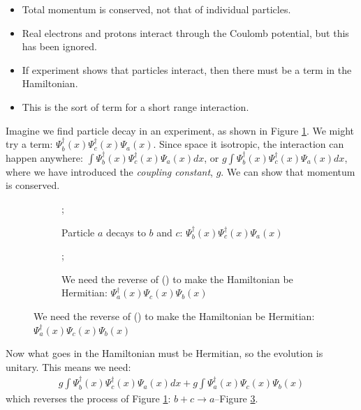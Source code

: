 \documentclass[]{article}
\begin{document}
\begin{itemize}
	\item Total momentum is conserved, not that of individual particles.
	\item Real electrons and protons interact through the Coulomb potential, but this has been ignored.
	\item If experiment shows that particles interact, then there must be a term in the Hamiltonian.
	\item This is the sort of term for a short range interaction.
\end{itemize}

Imagine we find particle decay in an experiment, as shown in Figure \ref{fig:particle:decay}. We might try a term: $\Psi^\dagger_b(x) \Psi^\dagger_c(x) \Psi_a(x)$. Since space it isotropic, the interaction can happen anywhere: $\int \Psi^\dagger_b(x) \Psi^\dagger_c(x) \Psi_a(x) dx$, or $g \int \Psi^\dagger_b(x) \Psi^\dagger_c(x) \Psi_a(x) dx$, where we have introduced the \emph{coupling constant}, $g$. We can show that momentum is conserved.

\begin{figure}[H]
	\caption{$\Psi^\dagger_b(x) \Psi^\dagger_c(x) \Psi_a(x) dx +  \Psi^\dagger_a(x) \Psi_c(x) \Psi_b(x)$}\label{fig:particle:decay:and:reverse}
	\begin{subfigure}{0.45\textwidth}
		\caption{Particle $a$ decays to $b$ and $c$: $\Psi^\dagger_b(x) \Psi^\dagger_c(x) \Psi_a(x)$}\label{fig:particle:decay}
		;
	\end{subfigure}
	\hfill
	\begin{subfigure}{0.45\textwidth}
		\caption{We need the reverse of () to make the Hamiltonian be Hermitian: $\Psi^\dagger_a(x) \Psi_c(x) \Psi_b(x)$}\label{fig:particle:decay:reverse}
		;
	\end{subfigure}
\end{figure}

Now what goes in the Hamiltonian must be Hermitian, so the evolution is unitary. This means we need:
\begin{align*}
	g \int \Psi^\dagger_b(x) \Psi^\dagger_c(x) \Psi_a(x) dx + g \int \Psi^\dagger_a(x) \Psi_c(x) \Psi_b(x)
\end{align*}
which reverses the process of  Figure \ref{fig:particle:decay}: $b+c\rightarrow a$--Figure \ref{fig:particle:decay:reverse}.
\end{document}

